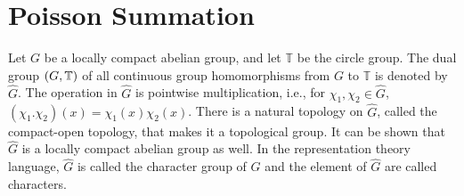 \documentclass[11pt]{article}
\theoremstyle{plain}
\theoremstyle{definition}
\let\hom\relax
\DeclareMathOperator{\hom}{Hom}
\begin{document}



\newpage
\appendix

\section{Poisson Summation}
Let $G$ be a locally compact abelian group, and let $\mathbb{T}$ be the circle group. The dual group $\hom(G, \mathbb{T})$ of all continuous group homomorphisms from $G$ to $\mathbb{T}$ is denoted by $\widehat{G}$. The operation in $\widehat{G}$ is pointwise multiplication, i.e., for $\chi_1, \chi_2 \in \widehat{G}$, $(\chi_1 . \chi_2)(x) = \chi_1(x)\chi_2(x)$. There is a natural topology on $\widehat{G}$, called the compact-open topology, that makes it a topological group. It can be shown that $\widehat{G}$ is a locally compact abelian group as well. In the representation theory language, $\widehat{G}$ is called the character group of $G$ and the element of $\widehat{G}$ are called characters. 
\end{document}
